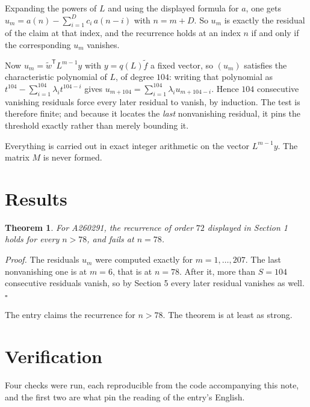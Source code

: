 \documentclass[11pt]{article}
\newtheorem{theorem}{Theorem}
\theoremstyle{definition}
\begin{document}
Expanding the powers of $L$ and using the displayed formula for $a$, one gets $u_m = a(n) - \sum_{i=1}^{D} c_i\,a(n-i)$ with $n = m + D$. So $u_m$ is exactly the residual of the claim at that index, and the recurrence holds at an index $n$ if and only if the corresponding $u_m$ vanishes.

Now $u_m = \tilde w^{\mathsf T} L^{m-1} y$ with $y = q(L)\tilde f$ a fixed vector, so $(u_m)$ satisfies the characteristic polynomial of $L$, of degree $104$: writing that polynomial as $t^{104} - \sum_{i=1}^{104} \lambda_i t^{104-i}$ gives $u_{m+104} = \sum_{i=1}^{104} \lambda_i u_{m+104-i}$. Hence $104$ consecutive vanishing residuals force every later residual to vanish, by induction. The test is therefore finite; and because it locates the {\itshape last} nonvanishing residual, it pins the threshold exactly rather than merely bounding it.

Everything is carried out in exact integer arithmetic on the vector $L^{m-1}y$. The matrix $M$ is never formed.

\section{Results}

\begin{theorem} For A260291, the recurrence of order $72$ displayed in Section 1 holds for every $n > 78$, and fails at $n = 78$.\end{theorem}

{\itshape Proof.} The residuals $u_m$ were computed exactly for $m = 1,\dots,207$. The last nonvanishing one is at $m = 6$, that is at $n = 78$. After it, more than $S = 104$ consecutive residuals vanish, so by Section 5 every later residual vanishes as well. $\square$

The entry claims the recurrence for $n > 78$. The theorem is at least as strong.

\section{Verification}

Four checks were run, each reproducible from the code accompanying this note, and the first two are what pin the reading of the entry's English.
\end{document}
